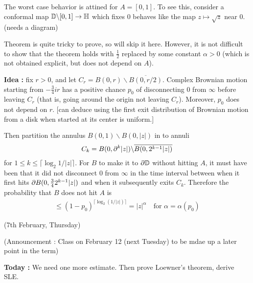 \documentclass[12pt,a4paper]{article}
\newenvironment{proof}
{\begin{changemargin}{0.5cm}{0.5cm} 
	}%
	{\end{changemargin}
}
\newenvironment{p}
{\begin{proof} 
	}%
	{\end{proof}
}
\begin{document}
\begin{p}
The worst case behavior is attined for $A = [0,1]$. To see this, consider a conformal map $\mathbb{D} \backslash [0,1] \rightarrow \mathbb{H}$ which fixes 0 behaves like the map $z\mapsto \sqrt{z}$ near 0. (needs a diagram)
\s

Theorem is quite tricky to prove, so will skip it here. However, it is not difficult to show that the theorem holds with $\frac{1}{2}$ replaced by some constant $\alpha>0$ (which is not obtained explicit, but does not depend on $A$).
\s

\textbf{Idea :} fix $r>0$, and let $C_r = B(0, r) \backslash \overline{B(0, r/2)}$. Complex Brownian motion starting from $-\frac{3}{4}ir$ has a positive chance $p_0$ of disconnecting 0 from $\infty$ before leaving $C_r$ (that is, going around the origin not leaving $C_r$). Moreover, $p_0$ does not depend on $r$. [can deduce using the first exit distribution of Brownian motion from a disk when started at its center is uniform.]

\quad Then partition the annulus $B(0, 1) \backslash B(0, |z|)$ in to annuli
\begin{align*}
C_k = B(0, \partial^k |z|) \backslash \overline{B(0, 2^{k-1}|z|)}
\end{align*}
for $1\leq k \leq \lceil \log_2 1/|z| \rceil$. For $B$ to make it to $\partial \mathbb{D}$ without hitting $A$, it must have been that it did not disconnect 0 from $\infty$ in the time interval between when it first hits $\partial B(0, \frac{3}{4} 2^{k-1} |z|)$ and when it subsequently exits $C_k$. Therefore the probability that $B$ does not hit $A$ is
\begin{align*}
\leq (1-p_0)^{\lceil \log_2 (1/|z|) \rceil} = |z|^{\alpha} \quad \text{for } \alpha = \alpha(p_0)
\end{align*}
\end{p}
\s

\newday

(7th February, Thursday)
\s

(Announcement : Class on February 12 (next Tuesday) to be mdae up a later point in the term)
\s

\textbf{Today :} We need one more estimate. Then prove Loewner's theorem, derive SLE. 
\s
\end{document}

